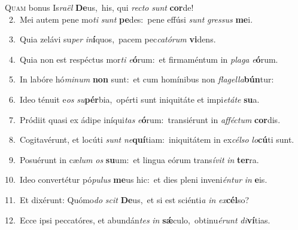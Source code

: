 \lettrine{\initial\textcolor{\initialcolor}{Q}}{uam} bonus Is\-\textit{ra}\-\textit{ël} \textbf{De}\-us,~\star his, qui \textit{rec}\-\textit{to} \textit{sunt} \textbf{cor}\-de!\\
{\numbfont\textcolor{\numbcolor}{~2.}}~Mei autem pene mo\textit{ti} \textit{sunt} \textbf{pe}\-des:~\star pene effúsi \textit{sunt} \textit{gres}\-\textit{sus} \textbf{me}\-i.\par
{\numbfont\textcolor{\numbcolor}{~3.}}~Quia zelávi su\textit{per} \textit{in}\-\textbf{í}quos,~\star pacem pec\-\textit{ca}\-\textit{tó}\textit{rum} \textbf{vi}\-dens.\par
{\numbfont\textcolor{\numbcolor}{~4.}}~Quia non est respéctus mor\textit{ti} \textit{e}\-\textbf{ó}rum:~\star et firmaméntum in \textit{pla}\-\textit{ga} \textit{e}\-\textbf{ó}rum.\par
{\numbfont\textcolor{\numbcolor}{~5.}}~In labóre hó\-\textit{mi}\-\textit{num} \textbf{non} sunt:~\star et cum homínibus non \textit{fla}\-\textit{gel}\textit{la}\textbf{bún}tur:\par
{\numbfont\textcolor{\numbcolor}{~6.}}~Ideo ténuit e\textit{os} \textit{su}\-\textbf{pér}bia,~\star opérti sunt iniquitáte et impi\-\textit{e}\-\textit{tá}\textit{te} \textbf{su}\-a.\par
{\numbfont\textcolor{\numbcolor}{~7.}}~Pródiit quasi ex ádipe iníqui\textit{tas} \textit{e}\-\textbf{ó}rum:~\star transiérunt in \textit{af}\-\textit{féc}\textit{tum} \textbf{cor}\-dis.\par
{\numbfont\textcolor{\numbcolor}{~8.}}~Cogitavérunt, et locúti \textit{sunt} \textit{ne}\-\textbf{quí}tiam:~\star iniquitátem in ex\-\textit{cél}\-\textit{so} \textit{lo}\-\textbf{cú}ti sunt.\par
{\numbfont\textcolor{\numbcolor}{~9.}}~Posuérunt in cæ\textit{lum} \textit{os} \textbf{su}\-um:~\star et lingua eórum trans\-\textit{í}\-\textit{vit} \textit{in} \textbf{ter}\-ra.\par
{\numbfont\textcolor{\numbcolor}{10.}}~Ideo convertétur pó\-\textit{pu}\-\textit{lus} \textbf{me}\-us hic:~\star et dies pleni inveni\-\textit{én}\-\textit{tur} \textit{in} \textbf{e}\-is.\par
{\numbfont\textcolor{\numbcolor}{11.}}~Et dixérunt: Quómo\textit{do} \textit{scit} \textbf{De}\-us,~\star et si est sciénti\textit{a} \textit{in} \textit{ex}\-\textbf{cél}so?\par
{\numbfont\textcolor{\numbcolor}{12.}}~Ecce ipsi peccatóres, et abundán\textit{tes} \textit{in} \textbf{sǽ}\-culo,~\star obtinu\-\textit{é}\-\textit{runt} \textit{di}\-\textbf{ví}tias.\par
